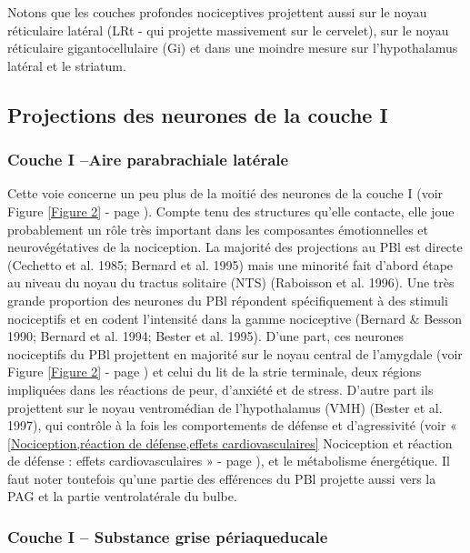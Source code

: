 \documentclass[a4paper,12pt,twoside]{report}
\begin{document}
Notons que les couches profondes nociceptives projettent aussi sur le noyau réticulaire latéral (LRt - qui projette massivement sur le cervelet), sur le noyau réticulaire gigantocellulaire (Gi) et dans une moindre mesure sur l'hypothalamus latéral et le striatum.

\subsection{Projections des neurones de la couche I}

\subsubsection{Couche I –Aire parabrachiale latérale}

Cette voie concerne un peu plus de la moitié des neurones de la couche I (voir Figure \ref{Figure 2} - page \pageref{Figure 2}). Compte tenu des structures qu’elle contacte, elle joue probablement un rôle très important dans les composantes émotionnelles et neurovégétatives de la nociception. La majorité des projections au PBl est directe (Cechetto et al. 1985; Bernard et al. 1995) mais une minorité fait d’abord étape au niveau du noyau du tractus solitaire (NTS) (Raboisson et al. 1996). Une très grande proportion des neurones du PBl répondent spécifiquement à des stimuli nociceptifs et en codent l'intensité dans la gamme nociceptive (Bernard \& Besson 1990; Bernard et al. 1994; Bester et al. 1995). D’une part, ces neurones nociceptifs du PBl projettent en majorité sur le noyau central de l’amygdale (voir Figure \ref{Figure 2} - page \pageref{Figure 2}) et celui du lit de la strie terminale, deux régions impliquées dans les réactions de peur, d’anxiété et de stress. D’autre part ils projettent sur le noyau ventromédian de l’hypothalamus (VMH) (Bester et al. 1997), qui contrôle à la fois les comportements de défense et d'agressivité (voir « \ref{Nociception,réaction de défense,effets cardiovasculaires} Nociception et réaction de défense : effets cardiovasculaires » - page \pageref{Nociception,réaction de défense,effets cardiovasculaires}), et le métabolisme énergétique. Il faut noter toutefois qu’une partie des efférences du PBl projette aussi vers la PAG et la partie ventrolatérale du bulbe.

\subsubsection{Couche I – Substance grise périaqueducale}
\end{document}
